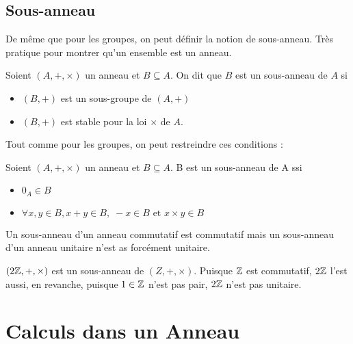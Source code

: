 \subsection{Sous-anneau}

De même que pour les groupes, on peut définir la notion de sous-anneau. Très pratique pour montrer qu'un ensemble est un 
anneau. 

\begin{definition}
    Soient $(A,+,\times)$ un anneau et $B \subseteq A$. On dit que $B$ est un sous-anneau de $A$ si 
    \begin{itemize}
        \item $(B,+)$ est un sous-groupe de $(A,+)$ 
        \item $(B,+)$ est stable pour la loi $\times$ de $A$. 
    \end{itemize}
\end{definition}

Tout comme pour les groupes, on peut restreindre ces conditions : 

\begin{proposition}
    Soient $(A,+,\times)$ un anneau et $B \subseteq A$. B est un sous-anneau de A ssi 
    \begin{itemize}
        \item $0_A \in B$ 
        \item $ \forall x,y \in B, x+y \in B, \; -x \in B \text{ et } x \times y \in B$ 
    \end{itemize}
\end{proposition}

\begin{remark}
    Un sous-anneau d'un anneau commutatif est commutatif mais un sous-anneau d'un anneau unitaire n'est as forcément unitaire. 
\end{remark}

\begin{example}
    $(2\mathbb{Z},+,\times)$ est un sous-anneau de $(Z,+,\times)$. Puisque $\mathbb{Z}$ est commutatif, $2\mathbb{Z}$ l'est aussi, 
    en revanche, puisque $1 \in \mathbb{Z}$ n'est pas pair, $2\mathbb{Z}$ n'est pas unitaire. 
\end{example}


\section{Calculs dans un Anneau}

